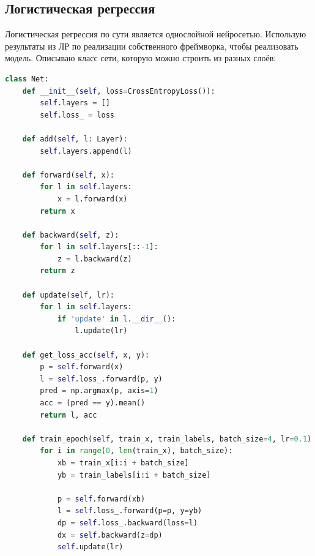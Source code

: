 \subsection{Логистическая регрессия}
Логистическая регрессия по сути является однослойной нейросетью. Использую результаты из ЛР по реализации собственного фреймворка, чтобы 
реализовать модель. Описываю класс сети, которую можно строить из разных слоёв:
\begin{lstlisting}[language=Python]
class Net:
    def __init__(self, loss=CrossEntropyLoss()):
        self.layers = []
        self.loss_ = loss

    def add(self, l: Layer):
        self.layers.append(l)

    def forward(self, x):
        for l in self.layers:
            x = l.forward(x)
        return x

    def backward(self, z):
        for l in self.layers[::-1]:
            z = l.backward(z)
        return z

    def update(self, lr):
        for l in self.layers:
            if 'update' in l.__dir__():
                l.update(lr)

    def get_loss_acc(self, x, y):
        p = self.forward(x)
        l = self.loss_.forward(p, y)
        pred = np.argmax(p, axis=1)
        acc = (pred == y).mean()
        return l, acc

    def train_epoch(self, train_x, train_labels, batch_size=4, lr=0.1):
        for i in range(0, len(train_x), batch_size):
            xb = train_x[i:i + batch_size]
            yb = train_labels[i:i + batch_size]

            p = self.forward(xb)
            l = self.loss_.forward(p=p, y=yb)
            dp = self.loss_.backward(loss=l)
            dx = self.backward(z=dp)
            self.update(lr)
\end{lstlisting}
\pagebreak

